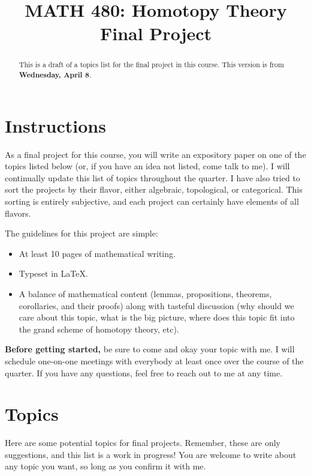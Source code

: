 \documentclass[10pt]{amsart}
\theoremstyle{definition}
\begin{document}
\title{MATH 480: Homotopy Theory Final Project}



\begin{abstract}
    This is a draft of a topics list for the final project in this course. 
    This version is from \textbf{Wednesday, April 8}.
\end{abstract}

\maketitle
\tableofcontents

\section{Instructions}
As a final project for this course, you will write an expository paper on one of the topics listed  below (or, if you have an idea not listed, come talk to me). I will continually update this list of topics throughout the quarter. I have also tried to sort the projects by their flavor, either algebraic, topological, or categorical. This sorting is entirely subjective, and each project can certainly have elements of all flavors.


The guidelines for this project are simple:
\begin{itemize}
    \item At least 10 pages of mathematical writing.
    \item Typeset in LaTeX.
    \item A balance of mathematical content (lemmas, propositions, theorems, corollaries, and their proofs) along with tasteful discussion (why should we care about this topic, what is the big picture, where does this topic fit into the grand scheme of homotopy theory, etc).
\end{itemize}
\textbf{Before getting started,} be sure to come and okay your topic with me. I will schedule one-on-one meetings with everybody at least once over the course of the quarter. If you have any questions, feel free to reach out to me at any time.

\section{Topics}
Here are some potential topics for final projects. Remember, these are only suggestions, and this list is a work in progress! You are welcome to write about any topic you want, so long as you confirm it with me.
\end{document}
